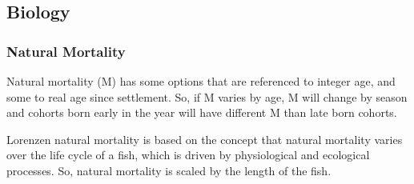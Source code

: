 \subsection{Biology}
\subsubsection{Natural Mortality}
Natural mortality (M) has some options that are referenced to integer age, and some to real age since settlement.  So, if M varies by age, M will change by season and cohorts born  early in the year will have different M than late born cohorts.

Lorenzen natural mortality is based on the concept that natural mortality varies over the life cycle of a fish, which is driven by physiological and ecological processes.  So, natural mortality is scaled by the length of the fish.

